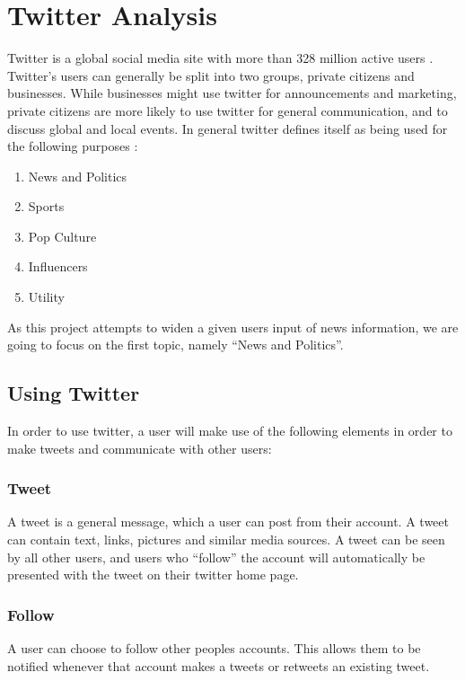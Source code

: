 \section{Twitter Analysis}\label{sec:twitter-analysis}
Twitter is a global social media site with more than 328 million active users
\citep{aboutTwitter}. Twitter's users can generally be split into two groups,
private citizens and businesses. While businesses might use twitter for
announcements and marketing, private citizens are more likely to use twitter for
general communication, and to discuss global and local events. In general
twitter defines itself as being used for the following purposes
\citep{StartingTwitter}:

\begin{enumerate}    
  \item News and Politics
  \item Sports 
  \item Pop Culture 
  \item Influencers 
  \item Utility 
\end{enumerate}

As this project attempts to widen a given users input of news information, we
are going to focus on the first topic, namely ``News and Politics''.

\subsection{Using Twitter}
In order to use twitter, a user will make use of the following elements
\citep{StartingTwitter} in order to make tweets and communicate with other
users:

\subsubsection{Tweet}
A tweet is a general message, which a user can post from their account. A tweet
can contain text, links, pictures and similar media sources. A tweet can be seen
by all other users, and users who ``follow'' the account will automatically be
presented with the tweet on their twitter home page.

\subsubsection{Follow}
A user can choose to follow other peoples accounts. This allows them to be
notified whenever that account makes a tweets or retweets an existing tweet.

